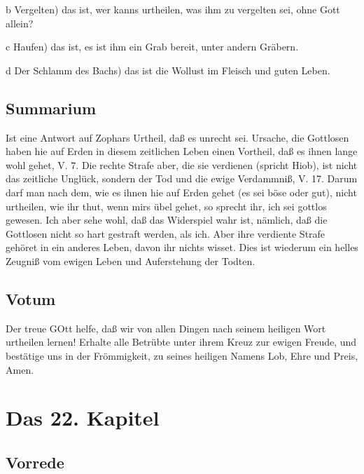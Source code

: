 b Vergelten) das ist, wer kanns urtheilen, was ihm zu vergelten sei, ohne Gott allein?

c Haufen) das ist, es ist ihm ein Grab bereit, unter andern Gräbern.

d Der Schlamm des Bachs) das ist die Wollust im Fleisch und guten Leben.

\section{Summarium}

Ist eine Antwort auf Zophars Urtheil, daß es unrecht sei. Ursache, die Gottlosen haben hie auf Erden in diesem zeitlichen Leben einen Vortheil, daß es ihnen lange wohl gehet, V. 7. Die rechte Strafe aber, die sie verdienen (spricht Hiob), ist nicht das zeitliche Unglück, sondern der Tod und die ewige Verdammniß, V. 17. Darum darf man nach dem, wie es ihnen hie auf Erden gehet (es sei böse oder gut), nicht urtheilen, wie ihr thut, wenn mirs übel gehet, so sprecht ihr, ich sei gottlos gewesen. Ich aber sehe wohl, daß das Widerspiel wahr ist, nämlich, daß die Gottlosen nicht so hart gestraft werden, als ich. Aber ihre verdiente Strafe gehöret in ein anderes Leben, davon ihr nichts wisset. Dies ist wiederum ein helles Zeugniß vom ewigen Leben und Auferstehung der Todten.

\section{Votum}

Der treue GOtt helfe, daß wir von allen Dingen nach seinem heiligen Wort urtheilen lernen! Erhalte alle Betrübte unter ihrem Kreuz zur ewigen Freude, und bestätige uns in der Frömmigkeit, zu seines heiligen Namens Lob, Ehre und Preis, Amen.

\chapter{Das 22. Kapitel}

\section{Vorrede}

